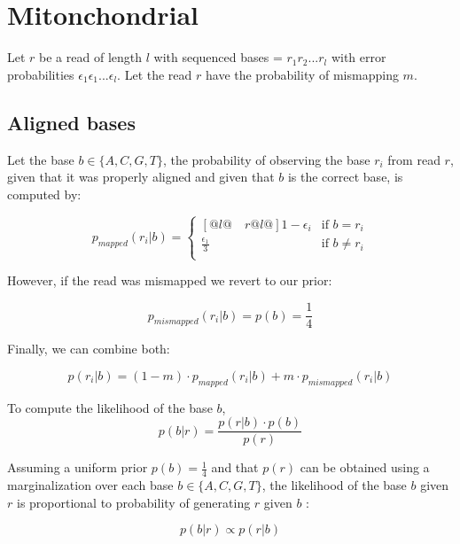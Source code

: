 \documentclass[a4paper,12pt]{article}
\begin{document}
\section{Mitonchondrial}

Let $r$ be a read of length $l$ with sequenced bases = $r_1 r_2 ... r_l$ with error probabilities  $\epsilon_1 \epsilon_1 ... \epsilon_l$.  Let the read $r$ have the probability of mismapping $m$. 

\subsection{Aligned bases}

\noindent Let the base $b\in\{A,C,G,T\}$, the probability of observing the base $r_i$ from read $r$, given that it was properly aligned and given that $b$ is the correct base, is computed by:

\begin{equation}
  p_{mapped}(r_i|b)   = \begin{cases}[@{}l@{\quad}r@{}l@{}]
    1-\epsilon_i  &  \text{if }  b = r_i    \\
    \frac{ \epsilon_1} {3} &  \text{if }  b \ne r_i    \\
  \end{cases}
\end{equation} 

\noindent However, if the read was mismapped we revert to our prior:


\begin{equation}
  p_{mismapped}(r_i|b)   =  p(b) =     \frac{ 1} {4} 
\end{equation} 

\noindent Finally, we can combine both:

\begin{equation}
  p(r_i|b)   =  (1-m) \cdot p_{mapped}(r_i|b) + m \cdot p_{mismapped}(r_i|b) 
\end{equation} 


\noindent To compute the likelihood of the base $b$, 
\begin{equation}
p(b|r) = \frac {p(r|b) \cdot p(b)} {p(r)}
\end{equation} 

Assuming a uniform prior  $p(b) = \frac{ 1} {4}$ and that $p(r)$ can be obtained using a marginalization over each base $b\in\{A,C,G,T\}$, the likelihood of the base $b$ given $r$ is proportional to probability of generating $r$ given $b$ :

\begin{equation}
p(b|r) \propto p(r|b)
\end{equation} 
\end{document}
